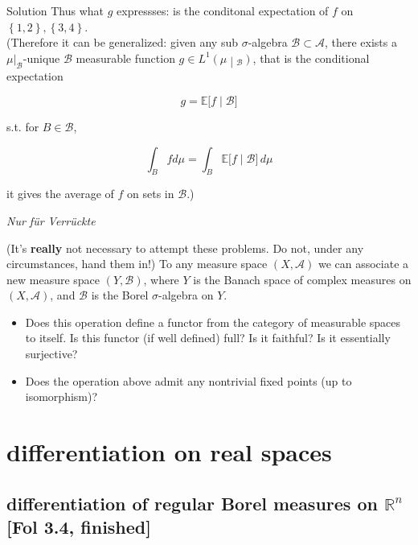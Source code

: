 \documentclass{qlnotes-export}
\begin{document}
\begin{qlsolution}{Solution}
Thus what \(g\) expressses: is the conditonal expectation of \(f\) on \(\left\{ {1,2} \right\},\left\{ {3,4} \right\}\).\\
(Therefore it can be generalized: given any sub \(\sigma\)-algebra \(\mathcal{B} \subset \mathcal{A}\), there exists a \(\mu|_{\mathcal{B}}\)-unique \(\mathcal{B}\) measurable function \(\left. g \in L^{1}(\mu \middle| {}_{\mathcal{B}}) \right.\), that is the conditional expectation

\[g = {\mathbb{E}}\lbrack f \mid \mathcal{B}\rbrack\]

s.t. for \(B \in \mathcal{B}\),

\[\int_{B}fd\mu = \int_{B}{\mathbb{E}}\lbrack f \mid \mathcal{B}\rbrack\, d\mu\]

it gives the average of \(f\) on sets in \(\mathcal{B}\).)

\end{qlsolution}

\emph{Nur für Verrückte}

(It's \textbf{really} not necessary to attempt these problems. Do not, under any circumstances, hand them in!) To any measure space \((X,\mathcal{A})\) we can associate a new measure space \((Y,\mathcal{B})\), where \(Y\) is the Banach space of complex measures on \((X,\mathcal{A})\), and \(\mathcal{B}\) is the Borel \(\sigma\)-algebra on \(Y\).

\begin{itemize}
\item
  Does this operation define a functor from the category of measurable spaces to itself. Is this functor (if well defined) full? Is it faithful? Is it essentially surjective?
\item
  Does the operation above admit any nontrivial fixed points (up to isomorphism)?
\end{itemize}

\chapter{differentiation on real spaces}\label{differentiation-on-real-spaces}

\section{\texorpdfstring{differentiation of regular Borel measures on \({\mathbb{R}}^{n}\) {[}Fol 3.4, finished{]}}{differentiation of regular Borel measures on \{\textbackslash mathbb\{R\}\}\^{}\{n\} {[}Fol 3.4, finished{]}}}
\end{document}
